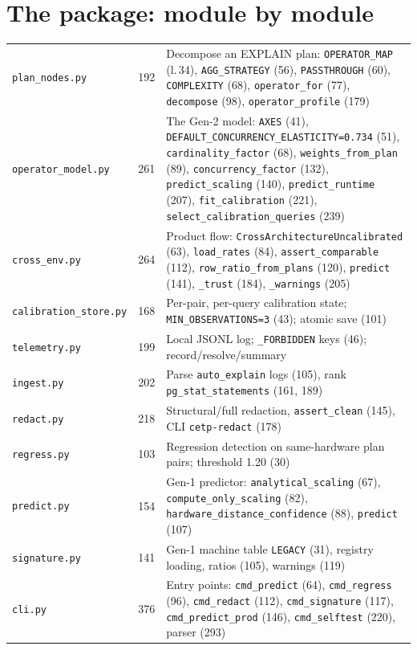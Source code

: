 \section{The package: module by module}
\begin{center}\small
\begin{longtable}{@{}L{3.1cm}R{0.9cm}L{10.4cm}@{}}
\toprule {} &  & \\ \midrule \endhead
\texttt{plan\_nodes.py} & 192 & Decompose an EXPLAIN plan: \texttt{OPERATOR\_MAP} (l.\,34), \texttt{AGG\_STRATEGY} (56), \texttt{PASSTHROUGH} (60), \texttt{COMPLEXITY} (68), \texttt{operator\_for} (77), \texttt{decompose} (98), \texttt{operator\_profile} (179)\\
\texttt{operator\_model.py} & 261 & The Gen-2 model: \texttt{AXES} (41), \texttt{DEFAULT\_CONCURRENCY\_ELASTICITY=0.734} (51), \texttt{cardinality\_factor} (68), \texttt{weights\_from\_plan} (89), \texttt{concurrency\_factor} (132), \texttt{predict\_scaling} (140), \texttt{predict\_runtime} (207), \texttt{fit\_calibration} (221), \texttt{select\_calibration\_queries} (239)\\
\texttt{cross\_env.py} & 264 & Product flow: \texttt{CrossArchitectureUncalibrated} (63), \texttt{load\_rates} (84), \texttt{assert\_comparable} (112), \texttt{row\_ratio\_from\_plans} (120), \texttt{predict} (141), \texttt{\_trust} (184), \texttt{\_warnings} (205)\\
\texttt{calibration\_store.py} & 168 & Per-pair, per-query calibration state; \texttt{MIN\_OBSERVATIONS=3} (43); atomic save (101)\\
\texttt{telemetry.py} & 199 & Local JSONL log; \texttt{\_FORBIDDEN} keys (46); record/resolve/summary\\
\texttt{ingest.py} & 202 & Parse \texttt{auto\_explain} logs (105), rank \texttt{pg\_stat\_statements} (161, 189)\\
\texttt{redact.py} & 218 & Structural/full redaction, \texttt{assert\_clean} (145), CLI \texttt{cetp-redact} (178)\\
\texttt{regress.py} & 103 & Regression detection on same-hardware plan pairs; threshold 1.20 (30)\\
\texttt{predict.py} & 154 & Gen-1 predictor: \texttt{analytical\_scaling} (67), \texttt{compute\_only\_scaling} (82), \texttt{hardware\_distance\_confidence} (88), \texttt{predict} (107)\\
\texttt{signature.py} & 141 & Gen-1 machine table \texttt{LEGACY} (31), registry loading, ratios (105), warnings (119)\\
\texttt{cli.py} & 376 & Entry points: \texttt{cmd\_predict} (64), \texttt{cmd\_regress} (96), \texttt{cmd\_redact} (112), \texttt{cmd\_signature} (117), \texttt{cmd\_predict\_prod} (146), \texttt{cmd\_selftest} (220), parser (293)\\
\bottomrule
\end{longtable}
\end{center}

